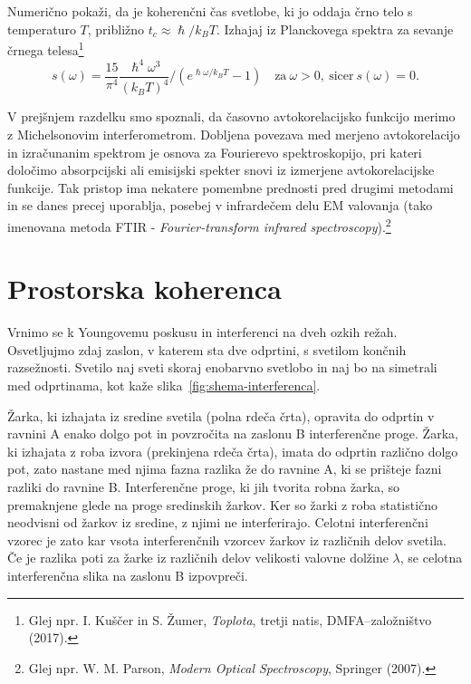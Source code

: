 \begin{naloga}\label{naloga-Planck}
Numerično pokaži, da je koherenčni čas svetlobe, ki jo oddaja črno telo s 
temperaturo $T$, približno $t_{c}\approx{\hslash}/{k_{B}T}$.
Izhajaj iz Planckovega spektra za sevanje črnega telesa\footnote{Glej
npr. I. Kuščer in S. Žumer, {\it Toplota}, tretji natis, DMFA--založništvo (2017).} 
\begin{equation}
s(\omega)=\frac{15}{\pi^{4}} \frac{\hslash^4\omega^3}{(k_{B}T)^4}/\left(e^{\hslash\omega/k_{B}T}-1\right)
\quad \textrm{za}~\omega >0,~\textrm{sicer}~s(\omega) = 0.
\label{eq:Planckov-spekter}
\end{equation}
\end{naloga}

\begin{remark}
V prejšnjem razdelku smo spoznali, da časovno avtokorelacijsko funkcijo
merimo z Michelsonovim interferometrom. Dobljena povezava med merjeno
avtokorelacijo in izračunanim spektrom je osnova za Fourierevo 
spektroskopijo,
pri kateri določimo absorpcijski ali emisijski spekter
snovi iz izmerjene avtokorelacijske funkcije. Tak pristop
ima nekatere pomembne prednosti pred drugimi metodami in se danes
precej uporablja, posebej v infrardečem delu EM valovanja (tako imenovana
metoda FTIR - {\it Fourier-transform infrared spectroscopy}).\footnote{Glej
npr. W. M. Parson, {\it Modern Optical Spectroscopy}, Springer (2007).}
\end{remark}

\section{Prostorska koherenca}
\label{Prostorska-koherenca}
Vrnimo se k Youngovemu poskusu in interferenci
 na dveh ozkih režah. Osvetljujmo zdaj zaslon, v katerem sta dve odprtini,
s svetilom končnih razsežnosti. Svetilo naj sveti skoraj enobarvno
svetlobo in naj bo na simetrali med odprtinama, kot kaže slika~\ref{fig:shema-interferenca}.

Žarka, ki izhajata iz sredine svetila (polna rdeča črta), 
opravita do odprtin v ravnini A enako dolgo pot in povzročita na zaslonu B 
interferenčne proge. Žarka, ki izhajata z roba izvora (prekinjena rdeča črta), 
imata do odprtin različno dolgo pot, zato nastane med njima fazna razlika že do ravnine A, 
ki se prišteje fazni razliki do ravnine B. Interferenčne proge, ki jih tvorita 
robna žarka, so premaknjene glede na proge sredinskih žarkov. Ker so žarki z roba
statistično neodvisni od žarkov iz sredine, z njimi
ne interferirajo. Celotni interferenčni vzorec je zato kar vsota interferenčnih
vzorcev žarkov iz različnih delov svetila. Če je razlika poti za žarke
iz različnih delov velikosti valovne dolžine $\lambda$, se celotna
interferenčna slika na zaslonu B izpovpreči.

